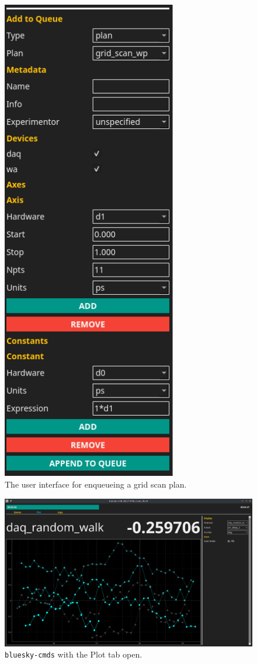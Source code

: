 \documentclass[11pt, full]{article}
\begin{document}
\begin{figure}
\includegraphics[width=3in]{"figures/grid_scan.png"}
\caption{The user interface for enqueueing a grid scan plan.}
\label{acq:fig:grid_scan}
\end{figure}

\clearpage

\begin{landscape}
\begin{figure}
\includegraphics[width=9in]{"figures/plot_tab.png"}
	\caption{\texttt{bluesky-cmds} with the Plot tab open.}
\label{acq:fig:plot_tab}
\end{figure}
\end{landscape}
\end{document}
